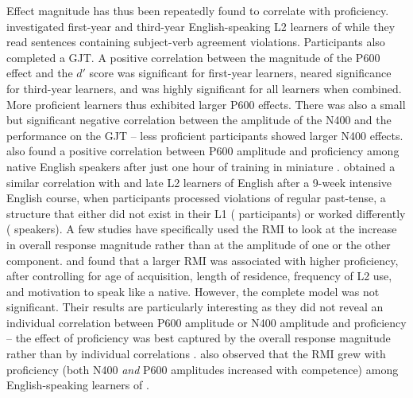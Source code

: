\documentclass[output=paper,colorlinks,citecolor=brown,modfonts,nonflat]{../langscibook}
\begin{document}
Effect magnitude has thus been repeatedly found to correlate with proficiency. \citet{TannerEtAl2009,TannerEtAl2013} investigated first-year and third-year English-speaking L2 learners of  while they read sentences containing subject-verb agreement violations. Participants also completed a  GJT. A positive correlation between the magnitude of the P600 effect and the $d′$ score was significant for first-year learners, neared significance for third-year learners, and was highly significant for all learners when combined. More proficient learners thus exhibited larger P600 effects. There was also a small but significant negative correlation between the amplitude of the N400 and the performance on the GJT – less proficient participants showed larger N400 effects. \citet{BatterinkNeville2013} also found a positive correlation between P600 amplitude and proficiency among native English speakers after just one hour of training in miniature . \citet{WhiteEtAl2012} obtained a similar correlation with  and  late L2 learners of English after a 9-week intensive English course, when participants processed violations of regular past-tense, a structure that either did not exist in their L1 ( participants) or worked differently ( speakers). A few studies have specifically used the RMI to look at the increase in overall response magnitude rather than at the amplitude of one or the other component. \citet{TannerEtAl2012} and \citet{TannerEtAl2014} found that a larger RMI was associated with higher proficiency, after controlling for age of acquisition, length of residence, frequency of L2 use, and motivation to speak like a native. However, the complete model was not significant. Their results are particularly interesting as they did not reveal an individual correlation between P600 amplitude or N400 amplitude and proficiency – the effect of proficiency was best captured by the overall response magnitude rather than by individual correlations \citep{TannerEtAl2014}. \citet{FromontEtAl2012} also observed that the RMI grew with proficiency (both N400 \textit{and} P600 amplitudes increased with competence) among English-speaking learners of .
\end{document}

